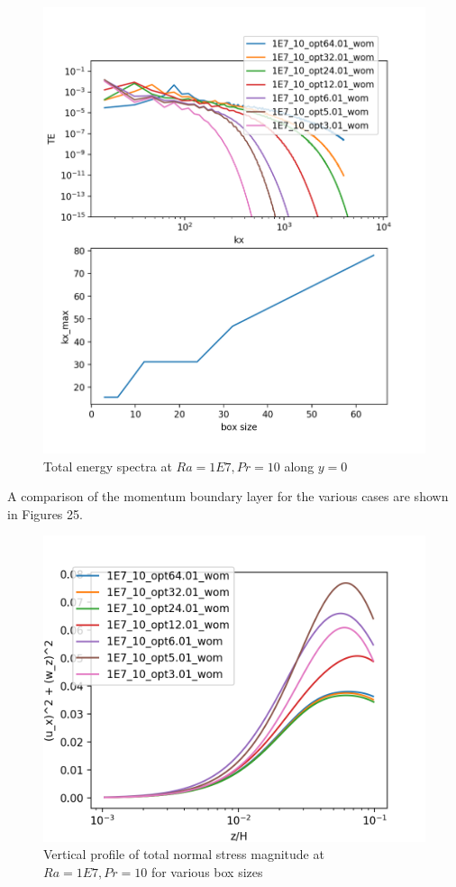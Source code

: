 \documentclass[12pt]{article}
\begin{document}
      \begin{figure}[!htb]
      	\includegraphics[width=\linewidth]{TE_1E7_10.png}
      	\caption{ Total energy spectra at $Ra = 1E7, Pr =10$ along $y = 0$}
      	\label{fig:fig24}
      \end{figure}
     
     A comparison of the momentum boundary layer for the various cases are shown in Figures 25.  
     
     \begin{figure}[!htb]
     	\includegraphics[width=\linewidth]{BL_1E7_10.png}
     	\caption{ Vertical profile of total normal stress magnitude at $Ra = 1E7, Pr =10$ for various box sizes}
     	\label{fig:fig25}
     \end{figure}
    
\end{document}
